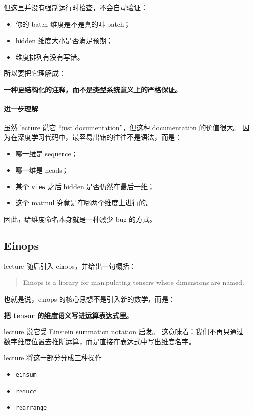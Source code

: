 \documentclass[a4paper,UTF8]{article}
\numberwithin{equation}{section}
\begin{document}
但这里并没有强制运行时检查，不会自动验证：
\begin{itemize}
    \item 你的 batch 维度是不是真的叫 batch；
    \item hidden 维度大小是否满足预期；
    \item 维度排列有没有写错。
\end{itemize}

所以要把它理解成：
\begin{center}
\textbf{一种更结构化的注释，而不是类型系统意义上的严格保证。}
\end{center}

\paragraph{进一步理解}
虽然 lecture 说它 ``just documentation''，但这种 documentation 的价值很大。  
因为在深度学习代码中，最容易出错的往往不是语法，而是：
\begin{itemize}
    \item 哪一维是 sequence；
    \item 哪一维是 heads；
    \item 某个 \verb|view| 之后 hidden 是否仍然在最后一维；
    \item 这个 matmul 究竟是在哪两个维度上进行的。
\end{itemize}

因此，给维度命名本身就是一种减少 bug 的方式。

\subsection{Einops}

lecture 随后引入 einops，并给出一句概括：
\begin{quote}
Einops is a library for manipulating tensors where dimensions are named.
\end{quote}

也就是说，einops 的核心思想不是引入新的数学，而是：
\begin{center}
\textbf{把 tensor 的维度语义写进运算表达式里。}
\end{center}

lecture 说它受 Einstein summation notation 启发。  
这意味着：我们不再只通过数字维度位置去推断运算，而是直接在表达式中写出维度名字。

lecture 将这一部分分成三种操作：
\begin{itemize}
    \item \verb|einsum|
    \item \verb|reduce|
    \item \verb|rearrange|
\end{itemize}
\end{document}
